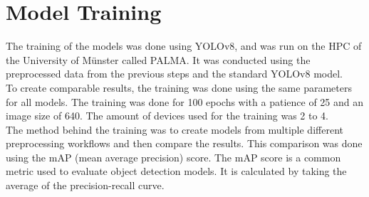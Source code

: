 \section{Model Training}

The training of the models was done using YOLOv8, and was run on the HPC of the University of Münster called PALMA. It was conducted using the preprocessed data from the previous steps and the standard YOLOv8 model. \\
To create comparable results, the training was done using the same parameters for all models. The training was done for 100 epochs with a patience of 25 and an image size of 640. The amount of devices used for the training was 2 to 4. \\ 
The method behind the training was to create models from multiple different preprocessing workflows and then compare the results. This comparison was done using the mAP (mean average precision) score. The mAP score is a common metric used to evaluate object detection models. It is calculated by taking the average of the precision-recall curve.

